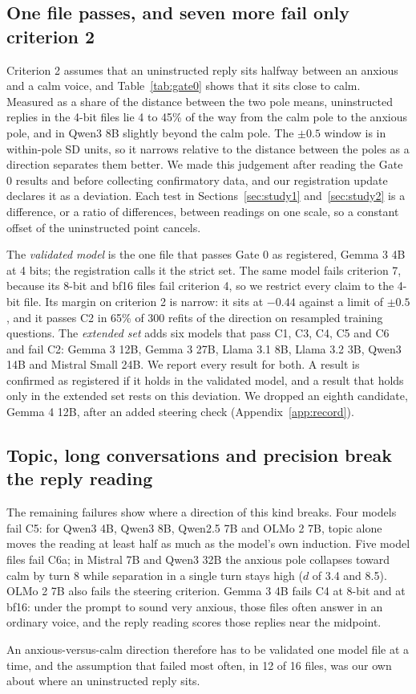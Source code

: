 \subsection{One file passes, and seven more fail only criterion 2}
Criterion 2 assumes that an uninstructed reply sits halfway between an anxious and a calm voice, and
Table~\ref{tab:gate0} shows that it sits close to calm.
Measured as a share of the distance between the two pole means, uninstructed replies in the 4-bit
files lie 4 to 45\% of the way from the calm pole to the anxious pole, and in Qwen3 8B slightly
beyond the calm pole.
The $\pm 0.5$ window is in within-pole SD units, so it narrows relative to the distance between the
poles as a direction separates them better.
We made this judgement after reading the Gate 0 results and before collecting confirmatory data,
and our registration update declares it as a deviation.
Each test in Sections~\ref{sec:study1} and~\ref{sec:study2} is a difference, or a ratio of
differences, between readings on one scale, so a constant offset of the uninstructed point cancels.

The \emph{validated model} is the one file that passes Gate 0 as registered, Gemma 3 4B at 4 bits;
the registration calls it the strict set.
The same model fails criterion 7, because its 8-bit and bf16 files fail criterion 4, so we restrict
every claim to the 4-bit file.
Its margin on criterion 2 is narrow: it sits at $-0.44$ against a limit of $\pm 0.5$, and it passes C2 in 65\% of
300 refits of the direction on resampled training questions.
The \emph{extended set} adds six models that pass C1, C3, C4, C5 and C6 and fail C2: Gemma 3 12B,
Gemma 3 27B, Llama 3.1 8B, Llama 3.2 3B, Qwen3 14B and Mistral Small 24B.
We report every result for both.
A result is confirmed as registered if it holds in the validated model, and a result that holds only
in the extended set rests on this deviation.
We dropped an eighth candidate, Gemma 4 12B, after an added steering check
(Appendix~\ref{app:record}).

\subsection{Topic, long conversations and precision break the reply reading}
The remaining failures show where a direction of this kind breaks.
Four models fail C5: for Qwen3 4B, Qwen3 8B, Qwen2.5 7B and OLMo 2 7B, topic alone moves the
reading at least half as much as the model's own induction.
Five model files fail C6a; in Mistral 7B and Qwen3 32B the anxious pole collapses toward calm by turn 8
while separation in a single turn stays high ($d$ of 3.4 and 8.5).
OLMo 2 7B also fails the steering criterion.
Gemma 3 4B fails C4 at 8-bit and at bf16: under the prompt to sound very anxious, those files often
answer in an ordinary voice, and the reply reading scores those replies near the midpoint.

An anxious-versus-calm direction therefore has to be validated one model file at a time, and the
assumption that failed most often, in 12 of 16 files, was our own about where an uninstructed reply
sits.
